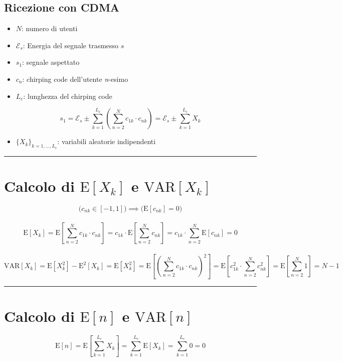 \documentclass[12pt, a4paper]{article}
\begin{document}
	
\begin{center} \section*{Ricezione con CDMA} \end{center}

\begin{itemize}[itemsep=0pt]
	\item $N$: numero di utenti
	\item $\mathcal{E}_s$: Energia del segnale trasmesso $s$ 
	\item $s_1$: segnale aspettato 
	\item $c_n$: chirping code dell'utente \textit{n}-esimo
	\item $L_c$: lunghezza del chirping code
\end{itemize}

\[
s_1 = \mathcal{E}_s \pm \sum_{k=1}^{L_c}\left(\sum_{n=2}^{N}c_{1k}\cdot c_{nk}\right)
  = \mathcal{E}_s \pm \sum_{k=1}^{L_c}X_k
\] 

\begin{itemize}[itemsep=0pt]
	\item $\{X_k\}_{k=1,\dots,L_c}$: variabili aleatorie indipendenti
\end{itemize}
\hrule

\section{Calcolo di $\mathrm{E}[X_k]$ e $\mathrm{VAR}[X_k]$}
\[
\Bigg( c_{nk}\in [-1,1] \Bigg) \implies \Bigg( \mathrm{E}[c_{nk}] = 0 \Bigg)
\] \\\vspace{-.5cm} \[
\mathrm{\mathrm{E}}[X_k] = \mathrm{E}\left[\sum_{n=2}^{N}c_{1k}\cdot c_{nk}\right] 
       = c_{1k}\cdot \mathrm{E}\left[\sum_{n=2}^{N}c_{nk}\right]
       = c_{1k}\cdot \sum_{n=2}^{N}\mathrm{E}[c_{nk}] 
       = 0
\] \\\vspace{-.5cm} \[
\mathrm{VAR}[X_k] = \mathrm{E}[X_k^2] - \mathrm{E}^2[X_k] = \mathrm{E}[X_k^2] = \mathrm{E}\left[\left(\sum_{n=2}^{N}c_{1k}\cdot c_{nk}\right)^2\right] =
\mathrm{E}\left[ c_{1k}^2\cdot \sum_{n=2}^{N}c_{nk}^2 \right] =
\mathrm{E}\left[ \sum_{n=2}^{N}1 \right] =
N-1
\]
\hrule
	
\section{Calcolo di $\mathrm{E}[n]$ e $\mathrm{VAR}[n]$}
\[
\mathrm{E}[n] = \mathrm{E}\left[ \sum_{k=1}^{L_c}X_k \right] =
\sum_{k=1}^{L_c}\mathrm{E}\left[ X_k \right] = \sum_{k=1}^{L_c}0 = 0
\] \\\vspace{-1.3cm} 
\end{document}
